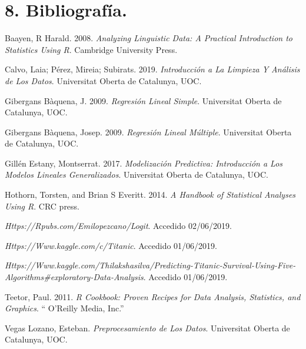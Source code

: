 \documentclass[]{article}
\begin{document}
\section*{8. Bibliografía.}\label{bibliografia.}

\hypertarget{refs}{}
\hypertarget{ref-baayen2008analyzing}{}
Baayen, R Harald. 2008. \emph{Analyzing Linguistic Data: A Practical
Introduction to Statistics Using R}. Cambridge University Press.

\hypertarget{ref-calvointroduccionlimpieza}{}
Calvo, Laia; Pérez, Mireia; Subirats. 2019. \emph{Introducción a La
Limpieza Y Análisis de Los Datos}. Universitat Oberta de Catalunya, UOC.

\hypertarget{ref-gibergansregresionsimple}{}
Gibergans Bàquena, J. 2009. \emph{Regresión Lineal Simple}. Universitat
Oberta de Catalunya, UOC.

\hypertarget{ref-gibergansregresionmultiple}{}
Gibergans Bàquena, Josep. 2009. \emph{Regresión Lineal Múltiple}.
Universitat Oberta de Catalunya, UOC.

\hypertarget{ref-gibergansregresionmuxfaltiple}{}
Gillén Estany, Montserrat. 2017. \emph{Modelización Predictiva:
Introducción a Los Modelos Lineales Generalizados}. Universitat Oberta
de Catalunya, UOC.

\hypertarget{ref-hothorn2014handbook}{}
Hothorn, Torsten, and Brian S Everitt. 2014. \emph{A Handbook of
Statistical Analyses Using R}. CRC press.

\hypertarget{ref-rpubsemilio}{}
\emph{Https://Rpubs.com/Emilopezcano/Logit}. Accedido 02/06/2019.

\hypertarget{ref-sthda}{}
\emph{Https://Www.kaggle.com/c/Titanic}. Accedido 01/06/2019.

\hypertarget{ref-kaggle}{}
\emph{Https://Www.kaggle.com/Thilakshasilva/Predicting-Titanic-Survival-Using-Five-Algorithms\#exploratory-Data-Analysis}.
Accedido 01/06/2019.

\hypertarget{ref-teetor2011r}{}
Teetor, Paul. 2011. \emph{R Cookbook: Proven Recipes for Data Analysis,
Statistics, and Graphics}. `` O'Reilly Media, Inc.''

\hypertarget{ref-vegaspreprocesamiento}{}
Vegas Lozano, Esteban. \emph{Preprocesamiento de Los Datos}. Universitat
Oberta de Catalunya, UOC.
\end{document}
